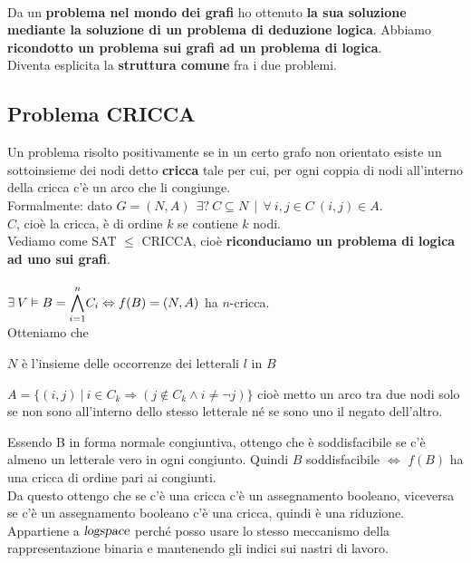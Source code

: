 \documentclass[10pt]{book}
\begin{document}
\paragraph{} Da un \textbf{problema nel mondo dei grafi} ho ottenuto \textbf{la sua soluzione mediante la soluzione di un problema di deduzione logica}. Abbiamo \textbf{ricondotto un problema sui grafi ad un problema di logica}.\\
Diventa esplicita la \textbf{struttura comune} fra i due problemi.
\subsection{Problema CRICCA}
Un problema risolto positivamente se in un certo grafo non orientato esiste un sottoinsieme dei nodi detto \textbf{cricca} tale per cui, per ogni coppia di nodi all'interno della cricca c'è un arco che li congiunge.\\
Formalmente: dato $G = (N, A)\:\:\exists?\:C\subseteq N\:\:|\:\:\forall\:i,j\in C\:(i,j)\in A$.\\
$C$, cioè la cricca, è di ordine $k$ se contiene $k$ nodi.\\
Vediamo come SAT $\leq$ CRICCA, cioè \textbf{riconduciamo un problema di logica ad uno sui grafi}.\\\\
$\exists\:V\vDash B = \mathlarger{\bigwedge_{i=1}^n} C_i \Leftrightarrow f(B) = (N, A)$ ha $n$-cricca.\\Otteniamo che
\begin{list}{}{}
	\item $N$ è l'insieme delle occorrenze dei letterali $l$ in $B$
	\item $A = \{(i, j)\:|\: i\in C_k \Rightarrow (j\not\in C_k \wedge i \neq \neg j)\}$ cioè metto un arco tra due nodi solo se non sono all'interno dello stesso letterale né se sono uno il negato dell'altro.
\end{list}
Essendo B in forma normale congiuntiva, ottengo che è soddisfacibile se c'è almeno un letterale vero in ogni congiunto. Quindi $B$ soddisfacibile $\Leftrightarrow$ $f(B)$ ha una cricca di ordine pari ai  congiunti.\\
Da questo ottengo che se c'è una cricca c'è un assegnamento booleano, viceversa se c'è un assegnamento booleano c'è una cricca, quindi è una riduzione.\\
Appartiene a $\textsl{logspace}$ perché posso usare lo stesso meccanismo della rappresentazione binaria e mantenendo gli indici sui nastri di lavoro.
\pagebreak
\end{document}
